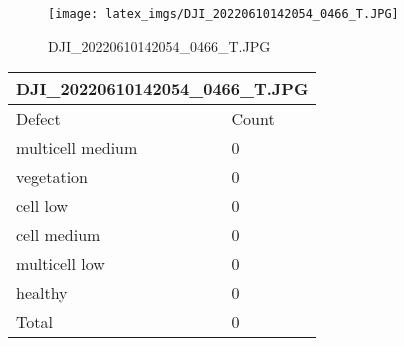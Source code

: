 \documentclass{article}%
\begin{document}
\begin{figure}[h!]%
\centering%
\texttt{[image: latex\_imgs/DJI\_20220610142054\_0466\_T.JPG]}%
\caption{DJI\_20220610142054\_0466\_T.JPG}%
\end{figure}

%
\begin{longtable}[c]{|l|l|}%
\hline%
\multicolumn{2}{|c|}{DJI\_20220610142054\_0466\_T.JPG}\\%
\hline%
Defect&Count\\%
\hline%
\endhead%
\hline%
multicell medium&0\\%
vegetation&0\\%
cell low&0\\%
cell medium&0\\%
multicell low&0\\%
healthy&0\\%
\hline%
Total&0\\%
\hline%
\end{longtable}%
\newpage

%
\end{document}
